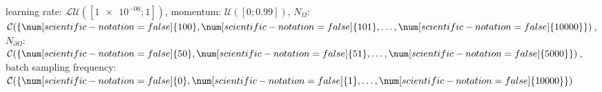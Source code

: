 learning rate: $\mathcal{LU}([\num[scientific-notation=true]{1e-06}; \num[scientific-notation=false]{1}])$, momentum: $\mathcal{U}([\num[scientific-notation=false]{0}; \num[scientific-notation=true]{0.99}])$, $N_{\Omega}$: $\mathcal{C}(\{\num[scientific-notation=false]{100},\num[scientific-notation=false]{101},\text{\dots},\num[scientific-notation=false]{10000}\})$, $N_{\partial\Omega}$: $\mathcal{C}(\{\num[scientific-notation=false]{50},\num[scientific-notation=false]{51},\text{\dots},\num[scientific-notation=false]{5000}\})$, batch sampling frequency: $\mathcal{C}(\{\num[scientific-notation=false]{0},\num[scientific-notation=false]{1},\text{\dots},\num[scientific-notation=false]{10000}\})$